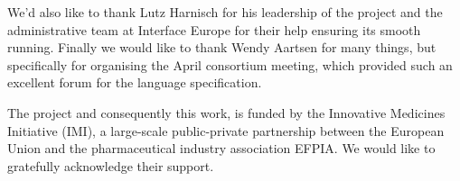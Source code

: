 We'd also like to thank Lutz Harnisch for his leadership of the
\ddmore project and the administrative team at Interface Europe for
their help ensuring its smooth running. Finally we would like to thank
Wendy Aartsen for many things, but specifically for organising the
April consortium meeting, which provided such an excellent forum for
the language specification.

The \ddmore project and consequently this work, is funded by the
Innovative Medicines Initiative (IMI), a large-scale public-private
partnership between the European Union and the pharmaceutical industry
association EFPIA\@. We would like to gratefully acknowledge their
support.



